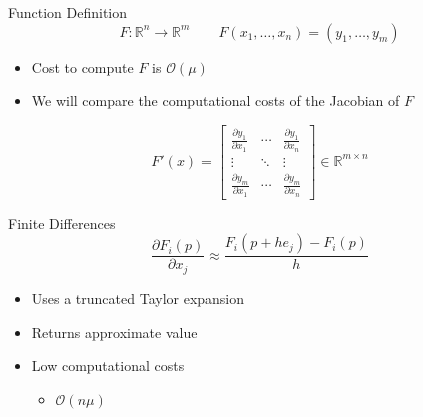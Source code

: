 \documentclass{beamer}
\begin{document}
\begin{frame}{Function Definition}
    \begin{equation*}
            F: \mathbb{R}^n \longrightarrow \mathbb{R}^m \qquad
            F(x_1, \ldots, x_n) = (y_1, \ldots, y_m)
    \end{equation*}

    \begin{itemize}
        \item Cost to compute $F$ is $\mathcal{O}(\mu)$ \\
        \item We will compare the computational costs of the Jacobian of $F$
    \end{itemize}
    
    \begin{equation*} \label{jacobian}
        F'(x) = \begin{bmatrix}
            \frac{\partial y_1}{\partial x_1} & \cdots & \frac{\partial y_1}{\partial x_n} \\
            \vdots & \ddots & \vdots \\
            \frac{\partial y_m}{\partial x_1} & \cdots & \frac{\partial y_m}{\partial x_n}
        \end{bmatrix} \in \mathbb{R}^{m \times n}
    \end{equation*}
\end{frame}


\begin{frame}{Finite Differences}
    \begin{equation*}
        \frac{\partial F_i (p)}{\partial x_j} \approx \frac{F_i(p+he_j) - F_i(p)}{h}
    \end{equation*}
    \begin{itemize}
        \item Uses a truncated Taylor expansion 
        \item Returns \alert{approximate} value
        \item Low computational costs
        \begin{itemize}
            \item $\mathcal{O}(n \mu)$
        \end{itemize}
    \end{itemize}
\end{frame}
\end{document}
